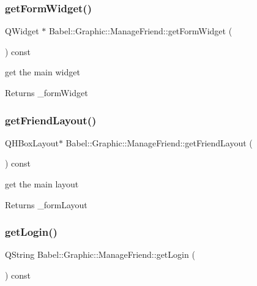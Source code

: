 \subsubsection{\texorpdfstring{get\+Form\+Widget()}{getFormWidget()}}
{\footnotesize\ttfamily Q\+Widget $\ast$ Babel\+::\+Graphic\+::\+Manage\+Friend\+::get\+Form\+Widget (\begin{DoxyParamCaption}{ }\end{DoxyParamCaption}) const}

get the main widget \begin{DoxyReturn}{Returns}
\+\_\+form\+Widget 
\end{DoxyReturn}
\mbox{\label{classBabel_1_1Graphic_1_1ManageFriend_a0bf570dcedd6de1c9c1e52ec07c959ba}} 
\subsubsection{\texorpdfstring{get\+Friend\+Layout()}{getFriendLayout()}}
{\footnotesize\ttfamily Q\+H\+Box\+Layout$\ast$ Babel\+::\+Graphic\+::\+Manage\+Friend\+::get\+Friend\+Layout (\begin{DoxyParamCaption}{ }\end{DoxyParamCaption}) const}

get the main layout \begin{DoxyReturn}{Returns}
\+\_\+form\+Layout 
\end{DoxyReturn}
\mbox{\label{classBabel_1_1Graphic_1_1ManageFriend_aee17ef4eacf0a66fc6ea19e93d35e85d}} 
\subsubsection{\texorpdfstring{get\+Login()}{getLogin()}}
{\footnotesize\ttfamily Q\+String Babel\+::\+Graphic\+::\+Manage\+Friend\+::get\+Login (\begin{DoxyParamCaption}{ }\end{DoxyParamCaption}) const}

